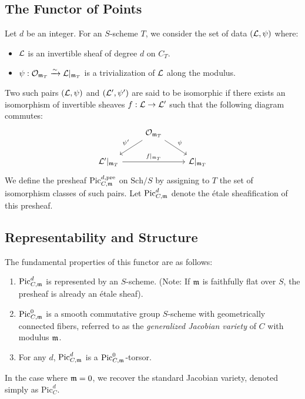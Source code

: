 \subsection*{The Functor of Points}
Let $d$ be an integer. For an $S$-scheme $T$, we consider the set of data $(\cL, \psi)$ where:
\begin{itemize}
    \item $\cL$ is an invertible sheaf of degree $d$ on $C_T$.
    \item $\psi: \Oo_{\mdls_T} \xrightarrow{\sim} \cL|_{\mdls_T}$ is a trivialization of $\cL$ along the modulus.
\end{itemize}
Two such pairs $(\cL, \psi)$ and $(\cL', \psi')$ are said to be isomorphic if there exists an isomorphism of invertible sheaves $f : \cL \to \cL'$ such that the following diagram commutes:
\[
\begin{tikzcd}
& \Oo_{\mdls_T} \arrow[dl, "\psi'"'] \arrow[dr, "\psi"] & \\
\cL'|_{\mdls_T} \arrow[rr, "f|_{\mdls_T}"] & & \cL|_{\mdls_T}
\end{tikzcd}
\]
We define the presheaf $\text{Pic}_{C, \mdls}^{d, \text{pre}}$ on $\text{Sch}/S$ by assigning to $T$ the set of isomorphism classes of such pairs. Let $\PicCm[d]$ denote the \'etale sheafification of this presheaf.

\subsection*{Representability and Structure}
The fundamental properties of this functor are as follows:
\begin{enumerate}
    \item $\text{Pic}_{C, \mdls}^{d}$ is represented by an $S$-scheme. (Note: If $\mdls$ is faithfully flat over $S$, the presheaf is already an \'etale sheaf).
    \item $\text{Pic}_{C, \mdls}^{0}$ is a smooth commutative group $S$-scheme with geometrically connected fibers, referred to as the \textit{generalized Jacobian variety} of $C$ with modulus $\mdls$.
    \item For any $d$, $\text{Pic}_{C, \mdls}^{d}$ is a $\text{Pic}_{C, \mdls}^{0}$-torsor.
\end{enumerate}
In the case where $\mdls = 0$, we recover the standard Jacobian variety, denoted simply as $\text{Pic}_C^d$.

